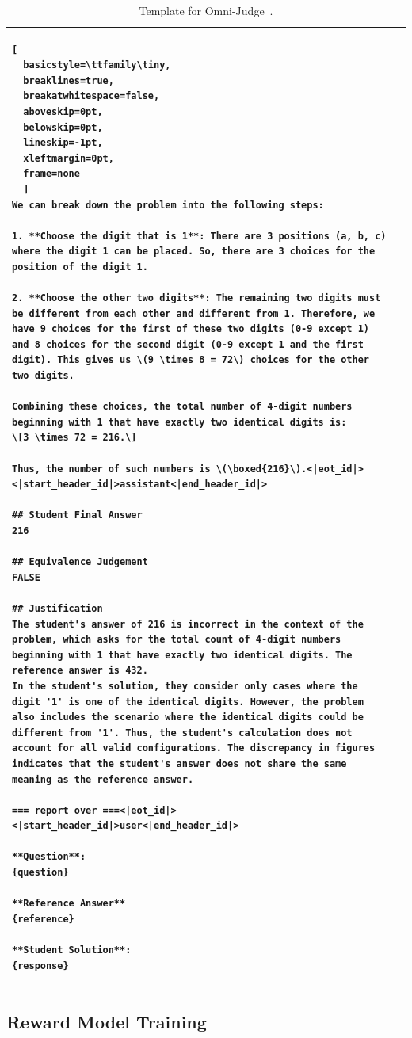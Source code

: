 \begin{table}
\begin{tabular}{lp{12cm}}
\begin{lstlisting}[
  basicstyle=\ttfamily\tiny,
  breaklines=true,
  breakatwhitespace=false,
  aboveskip=0pt,
  belowskip=0pt,
  lineskip=-1pt,
  xleftmargin=0pt,
  frame=none
  ]
We can break down the problem into the following steps:

1. **Choose the digit that is 1**: There are 3 positions (a, b, c) where the digit 1 can be placed. So, there are 3 choices for the position of the digit 1.

2. **Choose the other two digits**: The remaining two digits must be different from each other and different from 1. Therefore, we have 9 choices for the first of these two digits (0-9 except 1) and 8 choices for the second digit (0-9 except 1 and the first digit). This gives us \(9 \times 8 = 72\) choices for the other two digits.

Combining these choices, the total number of 4-digit numbers beginning with 1 that have exactly two identical digits is:
\[3 \times 72 = 216.\]

Thus, the number of such numbers is \(\boxed{216}\).<|eot_id|><|start_header_id|>assistant<|end_header_id|>

## Student Final Answer
216

## Equivalence Judgement
FALSE

## Justification
The student's answer of 216 is incorrect in the context of the problem, which asks for the total count of 4-digit numbers beginning with 1 that have exactly two identical digits. The reference answer is 432.
In the student's solution, they consider only cases where the digit '1' is one of the identical digits. However, the problem also includes the scenario where the identical digits could be different from '1'. Thus, the student's calculation does not account for all valid configurations. The discrepancy in figures indicates that the student's answer does not share the same meaning as the reference answer.

=== report over ===<|eot_id|><|start_header_id|>user<|end_header_id|>

**Question**:
{question}

**Reference Answer**
{reference}

**Student Solution**:
{response}
\end{lstlisting}
\\
\bottomrule
\end{tabular}
\caption{Template for Omni-Judge~\citep{gao2024omnimathuniversalolympiadlevel}.}
\label{tab:appendix:grade_template_omni}
\end{table}


\subsection{Reward Model Training}
\label{app:reward_model}

